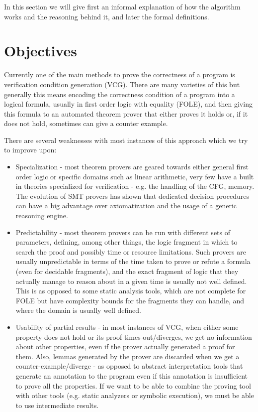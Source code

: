 In this section we will give first an informal explanation of how the algorithm works and the reasoning behind it, and later the formal definitions.

\section{Objectives}
Currently one of the main methods to prove the correctness of a program is verification condition generation (VCG).
There are many varieties of this but generally this means encoding the correctness condition of a program into a logical formula, usually in first order logic with equality (FOLE), and then giving this formula to an automated theorem prover that either proves it holds or, if it does not hold, sometimes can give a counter example.

There are several weaknesses with most instances of this approach which we try to improve upon:
\begin{itemize}
	\item Specialization - most theorem provers are geared towards either general first order logic or specific domains such as linear arithmetic, very few have a built in theories specialized for verification - e.g. the handling of the CFG, memory. The evolution of SMT provers has shown that dedicated decision procedures can have a big advantage over axiomatization and the usage of a generic reasoning engine.
	\item Predictability - most theorem provers can be run with different sets of parameters, defining, among other things, the logic fragment in which to search the proof and possibly time or resource limitations. Such provers are usually unpredictable in terms of the time taken to prove or refute a formula (even for decidable fragments), and the exact fragment of logic that they actually manage to reason about in a given time is usually not well defined. This is as opposed to some static analysis tools, which are not complete for FOLE but have complexity bounds for the fragments they can handle, and where the domain is usually well defined.
	\item Usability of partial results - in most instances of VCG, when either some property does not hold or its proof times-out/diverges, we get no information about other properties, even if the prover actually generated a proof for them. Also, lemmas generated by the prover are discarded when we get a counter-example/diverge - as opposed to abstract interpretation tools that generate an annotation to the program even if this annotation is insufficient to prove all the properties. If we want to be able to combine the proving tool with other tools (e.g. static analyzers or symbolic execution), we must be able to use intermediate results.
\end{itemize}

